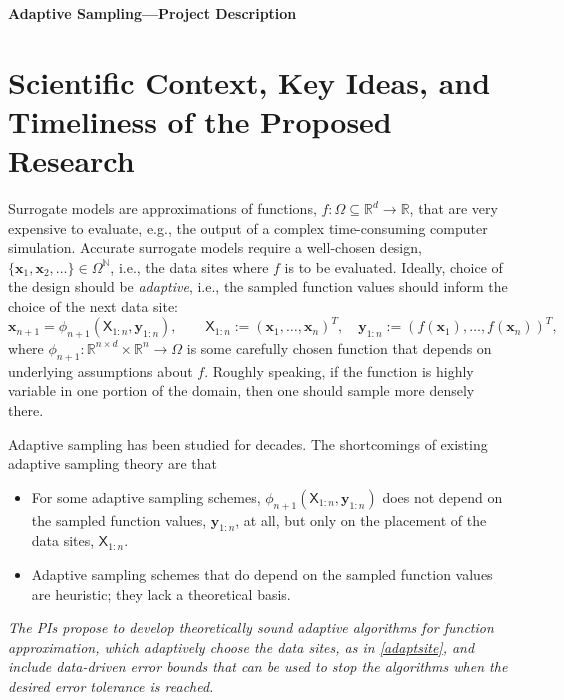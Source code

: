 \documentclass[11pt]{NSFamsart}
\newcommand{\reals}{{\mathbb{R}}}
\newcommand{\naturals}{{\mathbb{N}}}
\newcommand{\mX}{\mathsf{X}}
\newcommand{\bx}{{\boldsymbol{x}}}
\newcommand{\by}{{\boldsymbol{y}}}
\begin{document}

\centerline{\Large \textbf{Adaptive Sampling---Project Description}}
\vspace{-2ex}

\setcounter{tocdepth}{1}
\tableofcontents

\vspace{-6ex}

\section{Scientific Context, Key Ideas, and Timeliness of the Proposed Research}
Surrogate models are approximations of functions, $f: \Omega \subseteq \reals^d \to \reals$, that are very expensive to evaluate, e.g., the output of a complex time-consuming computer simulation.  Accurate surrogate models require a well-chosen design, $\{\bx_1, \bx_2, \ldots\} \in \Omega^{\naturals}$, i.e., the data sites where $f$ is to be evaluated.  Ideally, choice of the design should be \emph{adaptive}, i.e., the sampled function values should inform the choice of the next data site: 
\begin{equation} \label{adaptsite}
    \bx_{n+1} = \phi_{n+1}(\mX_{1:n},\by_{1:n}), \qquad \mX_{1:n} := (\bx_1, \ldots, \bx_n)^T, \quad  \by_{1:n} := (f(\bx_1), \ldots, f(\bx_n))^T,
\end{equation}
where $\phi_{n+1} : \reals^{n \times d} \times \reals^n \to \Omega$ is some carefully chosen function that depends on underlying assumptions about $f$.  Roughly speaking, if the function is highly variable in one portion of the domain, then one should sample more densely there. 

Adaptive sampling has been studied for decades.  The shortcomings of existing adaptive sampling theory are that
\begin{itemize}
    \item For some adaptive sampling schemes, $\phi_{n+1}(\mX_{1:n},\by_{1:n})$ does not depend on the sampled function values, $\by_{1:n}$, at all, but only on the placement of the data sites, $\mX_{1:n}$.
    
    \item Adaptive sampling schemes that do depend on the sampled function values are heuristic; they lack a theoretical basis.
\end{itemize}
\emph{The PIs propose to develop theoretically sound adaptive algorithms for function approximation, which adaptively choose the data sites, as in \eqref{adaptsite}, and include data-driven error bounds that can be used to stop the algorithms when the desired error tolerance is reached.}
\end{document}
